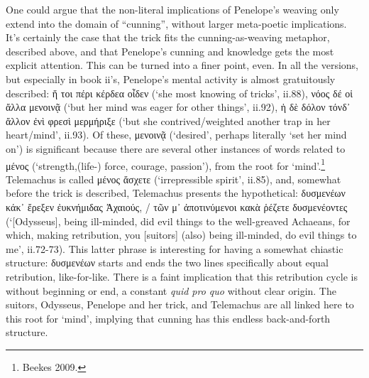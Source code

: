 \documentclass[12pt]{article}
\begin{document}
One could argue that the non-literal implications of Penelope's weaving only extend into the domain of ``cunning'', without larger meta-poetic implications. It's certainly the case that the trick fits the cunning-as-weaving metaphor, described above, and that Penelope's cunning and knowledge gets the most explicit attention. This can be turned into a finer point, even. In all the versions, but especially in book ii's, Penelope's mental activity is almost gratuitously described: ἥ τοι πέρι κέρδεα οἶδεν (`she most knowing of tricks', ii.88), νόος δέ οἱ ἄλλα μενοινᾷ (`but her mind was eager for other things', ii.92), ἡ δὲ δόλον τόνδ᾿ ἄλλον ἐνὶ φρεσὶ μερμήριξε (`but she contrived/weighted another trap in her heart/mind', ii.93). Of these, μενοινᾷ (`desired', perhaps literally `set her mind on') is significant because there are several other instances of words related to μένος (`strength,(life-) force, courage, passion'), from the root for `mind'.\footnote{ Beekes 2009.} Telemachus is called μένος ἄσχετε (`irrepressible spirit', ii.85), and, somewhat before the trick is described, Telemachus presents the hypothetical: δυσμενέων κάκ᾿ ἔρεξεν ἐυκνήμιδας Ἀχαιούς, / τῶν μ᾿ ἀποτινύμενοι κακὰ ῥέζετε δυσμενέοντες (`[Odysseus], being ill-minded, did evil things to the well-greaved Achaeans, for which, making retribution, you [suitors] (also) being ill-minded, do evil things to me', ii.72-73). This latter phrase is interesting for having a somewhat chiastic structure: δυσμενέων starts and ends the two lines specifically about equal retribution, like-for-like. There is a faint implication that this retribution cycle is without beginning or end, a constant \textit{quid pro quo} without clear origin. The suitors, Odysseus, Penelope and her trick, and Telemachus are all linked here to this root for `mind', implying that cunning has this endless back-and-forth structure.
\end{document}
